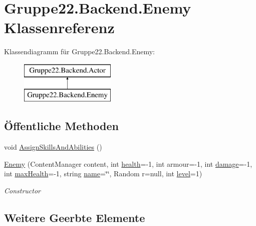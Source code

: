 \hypertarget{class_gruppe22_1_1_backend_1_1_enemy}{\section{Gruppe22.\-Backend.\-Enemy Klassenreferenz}
\label{class_gruppe22_1_1_backend_1_1_enemy}
}
Klassendiagramm für Gruppe22.\-Backend.\-Enemy\-:\begin{figure}[H]
\begin{center}
\leavevmode
\includegraphics[height=2.000000cm]{class_gruppe22_1_1_backend_1_1_enemy}
\end{center}
\end{figure}
\subsection*{Öffentliche Methoden}
\begin{DoxyCompactItemize}
\item 
void \hyperlink{class_gruppe22_1_1_backend_1_1_enemy_a661dd6ecfdfcf03b4779883dcb0ab266}{Assign\-Skills\-And\-Abilities} ()
\item 
\hyperlink{class_gruppe22_1_1_backend_1_1_enemy_a9049d94b790aaabe76eeafaa5cfcdfcf}{Enemy} (Content\-Manager content, int \hyperlink{class_gruppe22_1_1_backend_1_1_actor_a46f3a7d62de83a6bf3c44cd52f38af9b}{health}=-\/1, int armour=-\/1, int \hyperlink{class_gruppe22_1_1_backend_1_1_actor_a461e2480a59de23517c3b375dede10fb}{damage}=-\/1, int \hyperlink{class_gruppe22_1_1_backend_1_1_actor_aac0f2f9a2f0b314f98ba19d0b38a7a97}{max\-Health}=-\/1, string \hyperlink{class_gruppe22_1_1_backend_1_1_actor_a28129eaf9d70d9bfc33a29544ba74edf}{name}=\char`\"{}\char`\"{}, Random r=null, int \hyperlink{class_gruppe22_1_1_backend_1_1_actor_aef8ca8637a54602399de1b2d08670c9e}{level}=1)
\begin{DoxyCompactList}\small\item\em Constructor \end{DoxyCompactList}\end{DoxyCompactItemize}
\subsection*{Weitere Geerbte Elemente}


